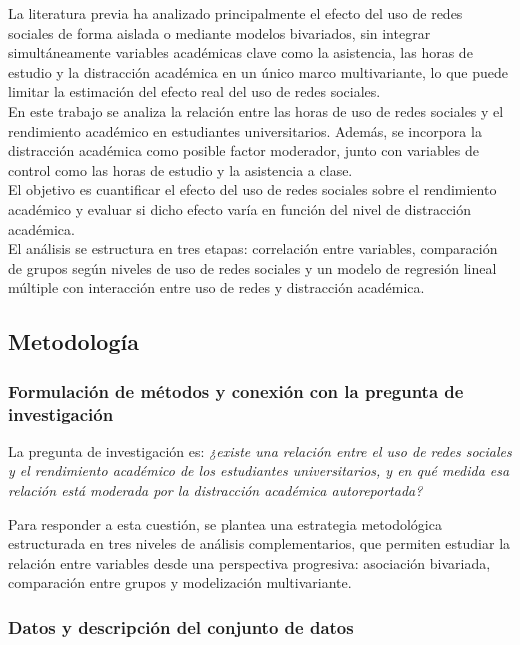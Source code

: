 \documentclass[12pt]{article}
\begin{document}
La literatura previa ha analizado principalmente el efecto del uso de redes sociales de forma aislada o mediante modelos bivariados, sin integrar simultáneamente variables académicas clave como la asistencia, las horas de estudio y la distracción académica en un único marco multivariante, lo que puede limitar la estimación del efecto real del uso de redes sociales.\\

En este trabajo se analiza la relación entre las horas de uso de redes sociales y el rendimiento académico en estudiantes universitarios. Además, se incorpora la distracción académica como posible factor moderador, junto con variables de control como las horas de estudio y la asistencia a clase.\\

El objetivo es cuantificar el efecto del uso de redes sociales sobre el rendimiento académico y evaluar si dicho efecto varía en función del nivel de distracción académica.\\

El análisis se estructura en tres etapas: correlación entre variables, comparación de grupos según niveles de uso de redes sociales y un modelo de regresión lineal múltiple con interacción entre uso de redes y distracción académica.

\subsection*{Metodología}

\subsubsection*{Formulación de métodos y conexión con la pregunta de investigación}

La pregunta de investigación es: \textit{¿existe una relación entre el uso de redes sociales y el rendimiento académico de los estudiantes universitarios, y en qué medida esa relación está moderada por la distracción académica autoreportada?}

Para responder a esta cuestión, se plantea una estrategia metodológica estructurada en tres niveles de análisis complementarios, que permiten estudiar la relación entre variables desde una perspectiva progresiva: asociación bivariada, comparación entre grupos y modelización multivariante.

\subsubsection*{Datos y descripción del conjunto de datos}
\end{document}
